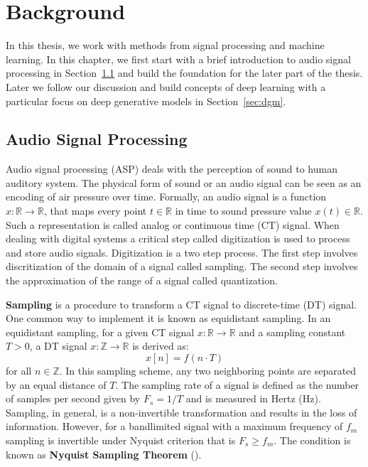 \chapter{Background}
\label{ch:background}
In this thesis, we work with methods from signal processing and machine learning. In this chapter, we first start with a brief introduction to audio signal processing in Section~\ref{sec:asp} and build the foundation for the later part of the thesis. Later we follow our discussion and build concepts of deep learning with a particular focus on deep generative models in Section~\ref{sec:dgm}.

\section{Audio Signal Processing}
\label{sec:asp}
Audio signal processing (ASP) deals with the perception of sound to human auditory system. The physical form of sound or an audio signal can be seen as an encoding of air pressure over time. Formally, an audio signal is a function $x:\mathbb{R}\rightarrow \mathbb{R}$, that maps every point $t\in \mathbb{R}$ in time to sound pressure value $x(t)\in \mathbb{R}$. Such a representation is called analog or continuous time (CT) signal. When dealing with digital systems a critical step called digitization is used to process and store audio signals. Digitization is a two step process. The first step involves discritization of the domain of a signal called sampling. The second step involves the approximation of the range of a signal called quantization. 

\textbf{Sampling} is a procedure to transform a CT signal to discrete-time (DT) signal. One common way to implement it is known as equidistant sampling. In an equidistant sampling, for a given CT signal $x:\mathbb{R}\rightarrow\mathbb{R}$ and a sampling constant $T>0$, a DT signal $x:\mathbb{Z}\rightarrow\mathbb{R}$ is derived as: 
\begin{equation}
\label{eq:sam}
x[n] = f(n\cdot T)    
\end{equation}
for all $n\in \mathbb{Z}$. In this sampling scheme, any two neighboring points are separated by an equal distance of $T$. The sampling rate of a signal is defined as the number of samples per second given by $F_s=1/T$ and is measured in Hertz (Hz). Sampling, in general, is a non-invertible transformation and results in the loss of information. However, for a bandlimited signal with a maximum frequency of $f_m$ sampling is invertible under Nyquist criterion that is $F_s\geq f_m$. The condition is known as \textbf{Nyquist Sampling Theorem} (\cite{nyquist1924certain}).


